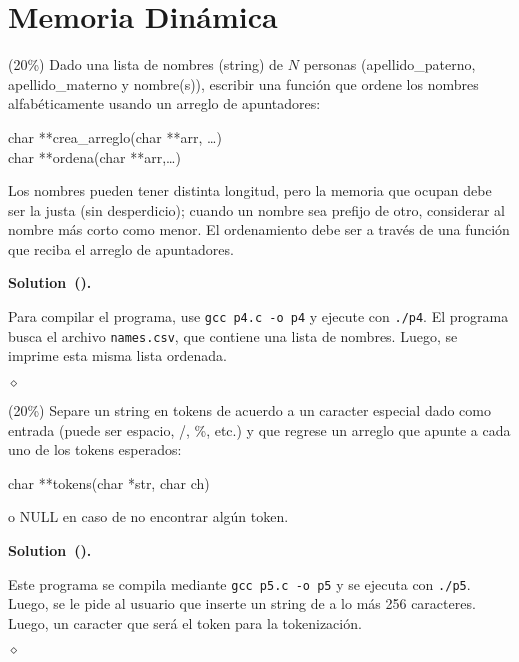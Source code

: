 \documentclass{article}
\theoremstyle{problemstyle}
\newenvironment{solution}[2]{%
  \begin{mdframed}[linewidth=0.8pt,linecolor=Gray,backgroundcolor=Gray!5,roundcorner=5pt, nobreak=#2]%
    \noindent\textbf{Solution\if\relax\detokenize{#1}\relax\else~(#1)\fi.}%
}{%
\hfill $ \diamond $ 
  \end{mdframed}%
}
\begin{document}
\section*{Memoria Din\'amica}\label{sec:memoria_din_amica} %
\begin{problem}
(20\%) Dado una lista de nombres (string) de $ N $ personas (apellido\_paterno, apellido\_materno y nombre(s)), escribir una funci\'on que ordene los nombres alfab\'eticamente usando un arreglo de apuntadores:
\begin{center}
	char **crea\_arreglo(char **arr, \dots)\\
	char **ordena(char **arr,\dots)
\end{center}
Los nombres pueden tener distinta longitud, pero la memoria que ocupan debe ser la justa (sin desperdicio); cuando un nombre sea prefijo de otro, considerar al nombre m\'as corto como menor. El ordenamiento debe ser a trav\'es de una funci\'on que reciba el arreglo de apuntadores.
\end{problem}
\begin{solution}{}{false}
  Para compilar el programa, use \texttt{gcc p4.c -o p4} y ejecute con \texttt{./p4}. El programa busca el archivo \texttt{names.csv}, que contiene una lista de nombres. Luego, se imprime esta misma lista ordenada.
	
\end{solution}

\begin{problem}
(20\%) Separe un string en tokens de acuerdo a un caracter especial dado como entrada (puede ser espacio, /, \%, etc.) y que regrese un arreglo que apunte a cada uno de los tokens esperados:
\begin{center}
	char **tokens(char *str, char ch)
\end{center}
o NULL en caso de no encontrar alg\'un token.

\end{problem}

\begin{solution}{}{false}
  Este programa se compila mediante \texttt{gcc p5.c -o p5} y se ejecuta con \texttt{./p5}. Luego, se le pide al usuario que inserte un string de a lo m\'as 256 caracteres. Luego, un caracter que ser\'a el token para la tokenizaci\'on.
	
\end{solution}
\end{document}

